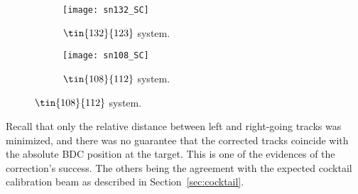 \begin{comment}

\begin{figure}[!htb]
    \centering
    \begin{subfigure}[t]{0.49\textwidth}
        \centering
        \texttt{[image: BDC\_P\_frac\_small\_angle.pdf]} 
        \caption{Generic} \label{fig:mom_S_1D}
    \end{subfigure}
    \hfill
    \begin{subfigure}[t]{0.49\textwidth}
        \centering
        \texttt{[image: BDC\_P\_frac\_large\_angle.pdf]} 
        \caption{Competitors} \label{fig:mom_L_1D}
    \end{subfigure}
    
\label{fig:mom_1D}
\end{figure}
\end{comment}






\begin{figure}[!htb]
    \centering
    \begin{subfigure}[t]{\textwidth}
        \centering
        \texttt{[image: sn132\_SC]} 
        \caption{$\tin{132}{123}$ system.} \label{fig:132momdist_sc}
    \end{subfigure}
   
    \begin{subfigure}[t]{\textwidth}
        \centering
        \texttt{[image: sn108\_SC]} 
        \caption{$\tin{108}{112}$ system.} \label{fig:108momdist_sc}
    \end{subfigure}
\label{fig:sc_momdist}
\end{figure}



Recall that only the relative distance between left and right-going tracks was minimized, and there was no guarantee that the corrected tracks coincide with the absolute BDC position at the target. This is one of the evidences of the correction's success. The others being the agreement with the expected cocktail calibration beam as described in Section~\ref{sec:cocktail}.

